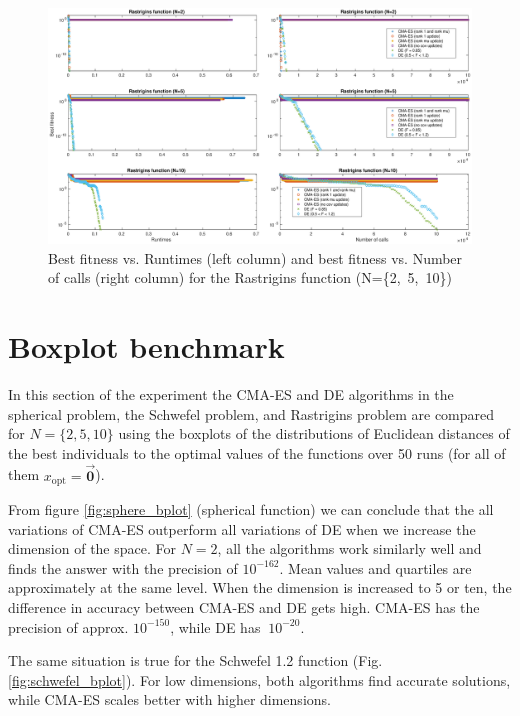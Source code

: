 \documentclass[12pt]{article}
\begin{document}
\begin{landscape}
\thispagestyle{empty}
    \begin{figure}
        \hspace*{-4.5cm}
        \includegraphics[width=1.5\linewidth]{pics/rastrigins.eps}
        \caption{Best fitness vs. Runtimes (left column) and
        best fitness vs. Number of calls (right column)
        for the Rastrigins function (N=\{2,~5,~10\})}
        \label{fig:rastrigin}
    \end{figure}
\end{landscape}

\section{Boxplot benchmark}

In this section of the experiment the CMA-ES and DE algorithms in the spherical problem, the Schwefel problem, and Rastrigins problem are compared for $N=\{2,5,10\}$ using the boxplots of the distributions of Euclidean distances of the best individuals to the optimal values of the functions over 50 runs (for all of them $x_{\text{opt}} = \mathbf{\vec{0}}$).

From figure \ref{fig:sphere_bplot} (spherical function) we can conclude that the all variations of CMA-ES outperform all variations of DE when we increase the dimension of the space. For $N=2$, all the algorithms work similarly well and finds the answer with the precision of $10^{-162}$. Mean values and quartiles are approximately at the same level. When the dimension is increased to 5 or ten, the difference in accuracy between CMA-ES and DE gets high. CMA-ES has the precision of approx. $10^{-150}$, while DE has $~10^{-20}$.

The same situation is true for the Schwefel 1.2 function (Fig. \ref{fig:schwefel_bplot}). For low dimensions, both algorithms find accurate solutions, while CMA-ES scales better with higher dimensions.
\end{document}
